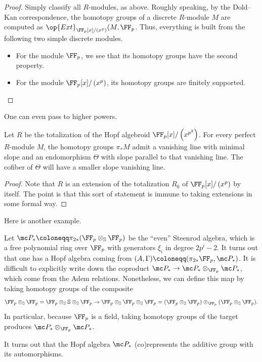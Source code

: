 \documentclass[../notes.tex]{subfiles}
\begin{document}
\begin{proof}
	Simply classify all $R$-modules, as above. Roughly speaking, by the Dold--Kan correspondence, the homotopy groups of a discrete $R$-module $M$ are computed as $\op{Ext}_{\FF_p[x]/\left(x^p\right)}(M,\FF_p$. Thus, everything is built from the following two simple discrete modules.
	\begin{itemize}
		\item For the module $\FF_p$, we see that its homotopy groups have the second property.
		\item For the module $\FF_p[x]/\left(x^p\right)$, its homotopy groups are finitely supported.
		\qedhere
	\end{itemize}
\end{proof}
One can even pass to higher powers.
\begin{proposition}
	Let $R$ be the totalization of the Hopf algebroid $\FF_p[x]/\left(x^{p^2}\right)$. For every perfect $R$-module $M$, the homotopy groups $\pi_*M$ admit a vanishing line with minimal slope and an endomorphism $\Theta$ with slope parallel to that vanishing line. The cofiber of $\Theta$ will have a smaller slope vanishing line.
\end{proposition}
\begin{proof}
	Note that $R$ is an extension of the totalization $R_0$ of $\FF_p[x]/\left(x^p\right)$ by itself. The point is that this sort of statement is immune to taking extensions in some formal way.
\end{proof}
Here is another example.
\begin{example}
	Let $\mc P_*\coloneqq\pi_{2*}(\FF_p\otimes_{\mathbb S}\FF_p)$ be the ``even'' Steenrod algebra, which is a free polynomial ring over $\FF_p$ with generators $\xi_i$ in degree $2p^i-2$. It turns out that one has a Hopf algebra coming from $(A,\Gamma)\coloneqq(\pi_{2*}\FF_p,\mc P_*)$. It is difficult to explicitly write down the coproduct $\mc P_*\to\mc P_*\otimes_{\FF_p}\mc P_*$, which come from the Adem relations. Nonetheless, we can define this map by taking homotopy groups of the composite
	\[\FF_p\otimes_{\mathbb S}\FF_p=\FF_p\otimes_{\mathbb S}\mathbb S\otimes_{\mathbb S}\FF_p\to\FF_p\otimes_{\mathbb S}\FF_p\otimes_{\mathbb S}\FF_p=(\FF_p\otimes_{\mathbb S}\FF_p)\otimes_{\FF_p}(\FF_p\otimes_{\mathbb S}\FF_p).\]
	In particular, because $\FF_p$ is a field, taking homotopy groups of the target produces $\mc P_*\otimes_{\FF_p}\mc P_*$.
\end{example}
\begin{remark}
	It turns out that the Hopf algebra $\mc P_*$ (co)represents the additive group with its automorphisms.
\end{remark}
\end{document}
